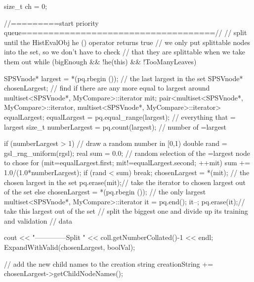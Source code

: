 \begin{DoxyCode}
{{      size_t ch = 0;
      
        //=========start priority queue====================================//
        // split until the HistEvalObj he () operator returns true
        // we only put splittable nodes into the set, so we don't have to check
        // that they are splittable when we take them out   
      while (bigEnough && !he(this) && !TooManyLeaves) {          
            SPSVnode* largest = *(pq.rbegin ()); // the last largest in the set
            SPSVnode* chosenLargest;
            // find if there are any more equal to largest around
            multiset<SPSVnode*, MyCompare>::iterator mit;
            pair<multiset<SPSVnode*, MyCompare>::iterator,
                multiset<SPSVnode*, MyCompare>::iterator> equalLargest;
            equalLargest = pq.equal_range(largest); // everything that =
       largest
            size_t numberLargest = pq.count(largest); // number of =largest

            if (numberLargest > 1) {
                // draw a random number in [0,1)
                double rand = gsl_rng_uniform(rgsl);
                real sum = 0.0;
                // random selection of the =largest node to chose
                for (mit=equalLargest.first; mit!=equalLargest.second; ++mit) {
                    sum += 1.0/(1.0*numberLargest);
                    if (rand < sum) {
                        break;
                    }
                }
                chosenLargest = *(mit); // the chosen largest in the set
                pq.erase(mit);// take the iterator to chosen largest out of the
       set
            }
            else {
                chosenLargest = *(pq.rbegin ()); // the only largest
                multiset<SPSVnode*, MyCompare>::iterator it = pq.end();
                it--;
                pq.erase(it);// take this largest out of the set
            }
            // split the biggest one and divide up its training and validation 
            // data
            
            cout << "--------------Split " << coll.getNumberCollated()-1 << 
      endl;
            ExpandWithValid(chosenLargest, boolVal);
                          
            // add the new child names to the creation string
            creationString += chosenLargest->getChildNodeNames();

}}}
\end{DoxyCode}
